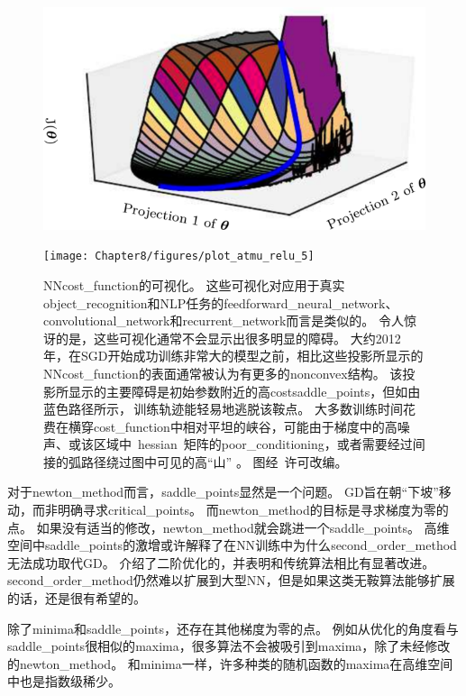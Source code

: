 \begin{figure}[!htb]
\ifOpenSource
\centerline{\includegraphics[scale=0.5]{images/64.png}}
\else
\centerline{\texttt{[image: Chapter8/figures/plot\_atmu\_relu\_5]}}
\fi
\caption{\gls{NN}\gls{cost_function}的可视化。
这些可视化对应用于真实\gls{object_recognition}和\gls{NLP}任务的\gls{feedforward_neural_network}、\gls{convolutional_network}和\gls{recurrent_network}而言是类似的。
令人惊讶的是，这些可视化通常不会显示出很多明显的障碍。
大约2012年，在\gls{SGD}开始成功训练非常大的模型之前，相比这些投影所显示的\gls{NN}\gls{cost_function}的表面通常被认为有更多的\gls{nonconvex}结构。
该投影所显示的主要障碍是初始参数附近的高\gls{cost}\gls{saddle_points}，但如由蓝色路径所示，\,训练轨迹能轻易地逃脱该鞍点。
大多数训练时间花费在横穿\gls{cost_function}中相对平坦的峡谷，可能由于梯度中的高噪声、或该区域中~\gls{hessian}~矩阵的\gls{poor_conditioning}，或者需要经过间接的弧路径绕过图中可见的高``山'' 。
图经~\citet{Goodfellow-et-al-2015}许可改编。
}
\label{fig:chap8_plot_atmu_relu_5}
\end{figure}


对于\gls{newton_method}而言，\gls{saddle_points}显然是一个问题。
\gls{GD}旨在朝``下坡''移动，而非明确寻求\gls{critical_points}。
而\gls{newton_method}的目标是寻求梯度为零的点。
如果没有适当的修改，\gls{newton_method}就会跳进一个\gls{saddle_points}。
高维空间中\gls{saddle_points}的激增或许解释了在\gls{NN}训练中为什么\gls{second_order_method}无法成功取代\gls{GD}。
\cite{Dauphin-et-al-2014}介绍了二阶优化的，并表明和传统算法相比有显著改进。
\gls{second_order_method}仍然难以扩展到大型\gls{NN}，但是如果这类无鞍算法能够扩展的话，还是很有希望的。


除了\gls{minima}和\gls{saddle_points}，还存在其他梯度为零的点。
例如从优化的角度看与\gls{saddle_points}很相似的\gls{maxima}，很多算法不会被吸引到\gls{maxima}，除了未经修改的\gls{newton_method}。
和\gls{minima}一样，许多种类的随机函数的\gls{maxima}在高维空间中也是指数级稀少。


